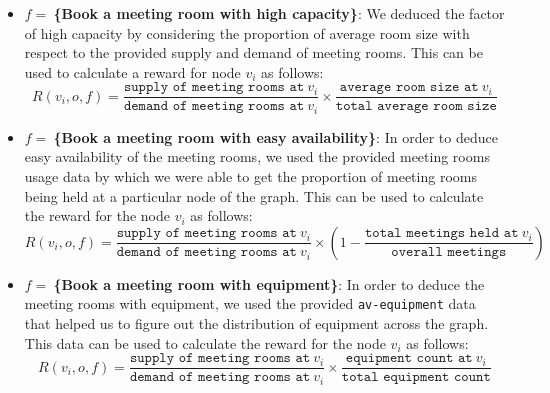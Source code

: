 \begin{itemize}
    \item \textbf{$f=\:$\{Book a meeting room with high capacity\}}: We deduced the factor of high capacity by considering the proportion of average room size with respect to the provided supply and demand of meeting rooms. This can be used to calculate a reward for node $v_i$ as follows:
    \begin{equation}
    R(v_i,o,f) = \frac{\texttt{supply of meeting rooms at}\:v_i}{\texttt{demand of meeting rooms at}\:v_i} \times \frac{\texttt{average room size at}\:v_i}{\texttt{total average room size}}
     \end{equation}
     
     \item \textbf{$f=\:$\{Book a meeting room with easy availability\}}: In order to deduce easy availability of the meeting rooms, we used the provided meeting rooms usage data by which we were able to get the proportion of meeting rooms being held at a particular node of the graph. This can be used to calculate the reward for the node $v_i$ as follows:
     \begin{equation}
         R(v_i,o,f) = \frac{\texttt{supply of meeting rooms at}\:v_i}{\texttt{demand of meeting rooms at}\:v_i} \times \left(1-\frac{\texttt{total meetings held at}\:v_i}{\texttt{overall meetings}}\right)
     \end{equation}
     
     \item \textbf{$f=\:$\{Book a meeting room with equipment\}}: In order to deduce the meeting rooms with equipment, we used the provided \texttt{av-equipment} data that helped us to figure out the distribution of equipment across the graph. This data can be used to calculate the reward for the node $v_i$ as follows:
     \begin{equation}
         R(v_i,o,f) = \frac{\texttt{supply of meeting rooms at}\:v_i}{\texttt{demand of meeting rooms at}\:v_i} \times \frac{\texttt{equipment count at}\:v_i}{\texttt{total equipment count}}
     \end{equation}
     

\end{itemize}

